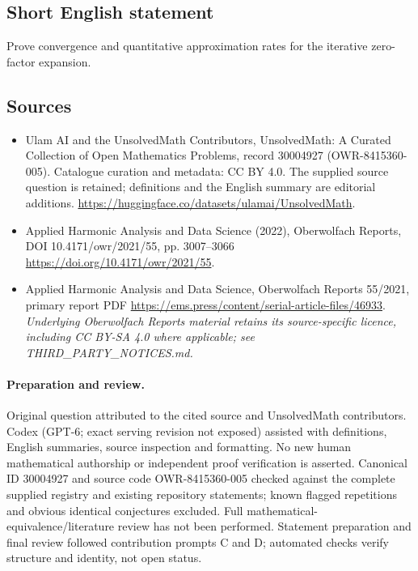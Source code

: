 \documentclass[11pt]{article}
\begin{document}
\subsection{Short English statement}
Prove convergence and quantitative approximation rates for the iterative zero-factor expansion.
\subsection{Sources}
\begin{itemize}
\item[\hypertarget{source:30004927:1}{S1}] Ulam AI and the UnsolvedMath Contributors, UnsolvedMath: A Curated Collection of Open Mathematics Problems, record 30004927 (OWR-8415360-005). Catalogue curation and metadata: CC BY 4.0. The supplied source question is retained; definitions and the English summary are editorial additions.
\url{https://huggingface.co/datasets/ulamai/UnsolvedMath}.
\item[\hypertarget{source:30004927:2}{S2}] Applied Harmonic Analysis and Data Science (2022), Oberwolfach Reports, DOI 10.4171/owr/2021/55, pp. 3007--3066
\url{https://doi.org/10.4171/owr/2021/55}.
\item[\hypertarget{source:30004927:3}{S3}] Applied Harmonic Analysis and Data Science, Oberwolfach Reports 55/2021, primary report PDF
\url{https://ems.press/content/serial-article-files/46933}.
\textit{Underlying Oberwolfach Reports material retains its source-specific licence, including CC BY-SA 4.0 where applicable; see THIRD\_PARTY\_NOTICES.md.}
\end{itemize}
\paragraph{Preparation and review.}
Original question attributed to the cited source and UnsolvedMath contributors. Codex (GPT-6; exact serving revision not exposed) assisted with definitions, English summaries, source inspection and formatting. No new human mathematical authorship or independent proof verification is asserted. Canonical ID 30004927 and source code OWR-8415360-005 checked against the complete supplied registry and existing repository statements; known flagged repetitions and obvious identical conjectures excluded. Full mathematical-equivalence/literature review has not been performed. Statement preparation and final review followed contribution prompts C and D; automated checks verify structure and identity, not open status.
\label{end:30004927}
\end{document}
